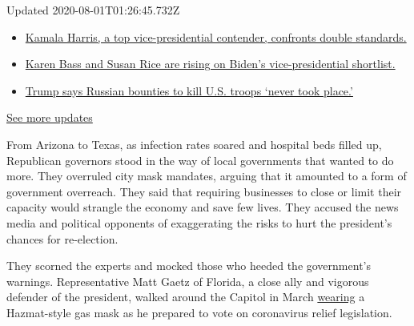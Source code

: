 Updated 2020-08-01T01:26:45.732Z

\begin{itemize}
\tightlist
\item
  \href{https://www.nytimes3xbfgragh.onion/2020/07/31/us/elections/biden-vs-trump.html?action=click\&pgtype=Article\&state=default\&region=MAIN_CONTENT_1\&context=storylines_live_updates\#link-29fdff45}{Kamala
  Harris, a top vice-presidential contender, confronts double
  standards.}
\item
  \href{https://www.nytimes3xbfgragh.onion/2020/07/31/us/elections/biden-vs-trump.html?action=click\&pgtype=Article\&state=default\&region=MAIN_CONTENT_1\&context=storylines_live_updates\#link-13ec3d9c}{Karen
  Bass and Susan Rice are rising on Biden's vice-presidential
  shortlist.}
\item
  \href{https://www.nytimes3xbfgragh.onion/2020/07/31/us/elections/biden-vs-trump.html?action=click\&pgtype=Article\&state=default\&region=MAIN_CONTENT_1\&context=storylines_live_updates\#link-49e9a016}{Trump
  says Russian bounties to kill U.S. troops `never took place.'}
\end{itemize}

\href{https://www.nytimes3xbfgragh.onion/2020/07/31/us/elections/biden-vs-trump.html?action=click\&pgtype=Article\&state=default\&region=MAIN_CONTENT_1\&context=storylines_live_updates}{See
more updates}

From Arizona to Texas, as infection rates soared and hospital beds
filled up, Republican governors stood in the way of local governments
that wanted to do more. They overruled city mask mandates, arguing that
it amounted to a form of government overreach. They said that requiring
businesses to close or limit their capacity would strangle the economy
and save few lives. They accused the news media and political opponents
of exaggerating the risks to hurt the president's chances for
re-election.

They scorned the experts and mocked those who heeded the government's
warnings. Representative Matt Gaetz of Florida, a close ally and
vigorous defender of the president, walked around the Capitol in March
\href{https://twitter.com/RepMattGaetz/status/1235309294146539520?ref_src=twsrc\%5Etfw\%7Ctwcamp\%5Etweetembed\%7Ctwterm\%5E1235309294146539520\%7Ctwgr\%5E\&ref_url=https\%3A\%2F\%2Fwww.cnn.com\%2F2020\%2F03\%2F04\%2Fpolitics\%2Fgaetz-coronavirus-gas-mask\%2Findex.html}{wearing}
a Hazmat-style gas mask as he prepared to vote on coronavirus relief
legislation.

